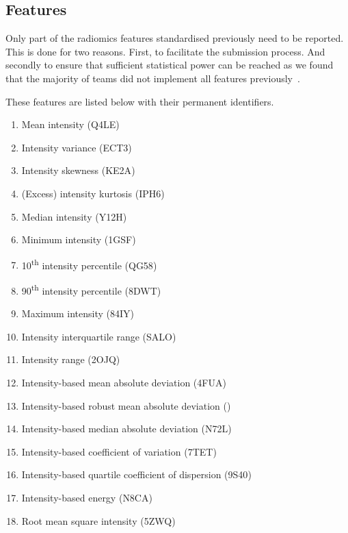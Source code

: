 \documentclass[fleqn,a4paper,oneside,openany]{book}
\newcommand\textid[1]{{\normalsize{\idfont #1}}}
\begin{document}
\subsection{Features}\label{sec:radiomicsfeaturesbenchmarking}
%
Only part of the radiomics features standardised previously need to be reported. This is done for two reasons. First, to facilitate the submission process. And secondly to ensure that sufficient statistical power can be reached as we found that the majority of teams did not implement all features previously~\cite{Zwanenburg2020-jt}.

These features are listed below with their permanent identifiers.

\begin{enumerate}
    \item Mean intensity (\textid{Q4LE})
    \item Intensity variance (\textid{ECT3})
    \item Intensity skewness (\textid{KE2A})
    \item (Excess) intensity kurtosis (\textid{IPH6})
    \item Median intensity (\textid{Y12H})
    \item Minimum intensity (\textid{1GSF})
    \item 10\textsuperscript{th} intensity percentile (\textid{QG58})
    \item 90\textsuperscript{th} intensity percentile (\textid{8DWT})
    \item Maximum intensity (\textid{84IY})
    \item Intensity interquartile range (\textid{SALO})
    \item Intensity range (\textid{2OJQ})
    \item Intensity-based mean absolute deviation (\textid{4FUA})
    \item Intensity-based robust mean absolute deviation (\textid{1128})
    \item Intensity-based median absolute deviation (\textid{N72L})
    \item Intensity-based coefficient of variation (\textid{7TET})
    \item Intensity-based quartile coefficient of dispersion (\textid{9S40})
    \item Intensity-based energy (\textid{N8CA})
    \item Root mean square intensity (\textid{5ZWQ})
\end{enumerate}
\end{document}
